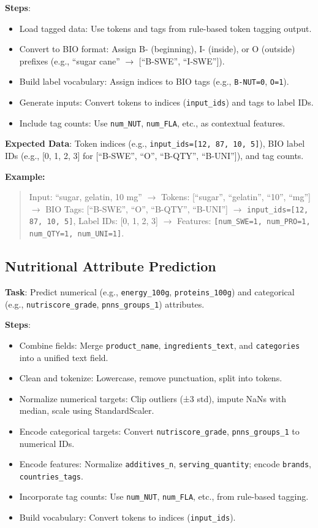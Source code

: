 \documentclass[11pt]{article}
\begin{document}
\textbf{Steps}:
\begin{itemize}[noitemsep]
    \item Load tagged data: Use tokens and tags from rule-based token tagging output.
    \item Convert to BIO format: Assign B- (beginning), I- (inside), or O (outside) prefixes (e.g., ``sugar cane'' $\to$ [``B-SWE'', ``I-SWE'']).
    \item Build label vocabulary: Assign indices to BIO tags (e.g., \texttt{B-NUT=0}, \texttt{O=1}).
    \item Generate inputs: Convert tokens to indices (\texttt{input\_ids}) and tags to label IDs.
    \item Include tag counts: Use \texttt{num\_NUT}, \texttt{num\_FLA}, etc., as contextual features.
\end{itemize}

\textbf{Expected Data}: Token indices (e.g., \texttt{input\_ids=[12, 87, 10, 5]}), BIO label IDs (e.g., [0, 1, 2, 3] for [``B-SWE'', ``O'', ``B-QTY'', ``B-UNI'']), and tag counts.

\textbf{Example:}
\begin{quote}
Input: ``sugar, gelatin, 10 mg'' $\to$ Tokens: [``sugar'', ``gelatin'', ``10'', ``mg''] $\to$ BIO Tags: [``B-SWE'', ``O'', ``B-QTY'', ``B-UNI''] $\to$ \texttt{input\_ids=[12, 87, 10, 5]}, Label IDs: [0, 1, 2, 3] $\to$ Features: \texttt{[num\_SWE=1, num\_PRO=1, num\_QTY=1, num\_UNI=1]}.
\end{quote}

\subsection{Nutritional Attribute Prediction}

\textbf{Task}: Predict numerical (e.g., \texttt{energy\_100g}, \texttt{proteins\_100g}) and categorical (e.g., \texttt{nutriscore\_grade}, \texttt{pnns\_groups\_1}) attributes.

\textbf{Steps}:
\begin{itemize}[noitemsep]
    \item Combine fields: Merge \texttt{product\_name}, \texttt{ingredients\_text}, and \texttt{categories} into a unified text field.
    \item Clean and tokenize: Lowercase, remove punctuation, split into tokens.
    \item Normalize numerical targets: Clip outliers (±3 std), impute NaNs with median, scale using StandardScaler.
    \item Encode categorical targets: Convert \texttt{nutriscore\_grade}, \texttt{pnns\_groups\_1} to numerical IDs.
    \item Encode features: Normalize \texttt{additives\_n}, \texttt{serving\_quantity}; encode \texttt{brands}, \texttt{countries\_tags}.
    \item Incorporate tag counts: Use \texttt{num\_NUT}, \texttt{num\_FLA}, etc., from rule-based tagging.
    \item Build vocabulary: Convert tokens to indices (\texttt{input\_ids}).
\end{itemize}
\end{document}

